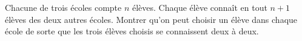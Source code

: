 Chacune de trois écoles compte $n$ élèves. Chaque élève connaît en tout $n + 1$ élèves des deux autres écoles. Montrer qu'on peut choisir un élève dans chaque école de sorte que les trois élèves choisis se connaissent deux à deux.
